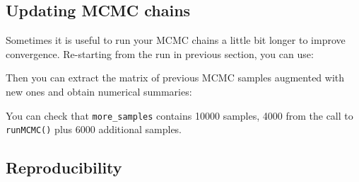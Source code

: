 \documentclass[
  12pt,
]{krantz}
\newenvironment{Shaded}{\begin{snugshade}}{\end{snugshade}}
\newcommand{\AttributeTok}[1]{\textcolor[rgb]{0.13,0.29,0.53}{#1}}
\newcommand{\ConstantTok}[1]{\textcolor[rgb]{0.56,0.35,0.01}{#1}}
\newcommand{\DecValTok}[1]{\textcolor[rgb]{0.00,0.00,0.81}{#1}}
\newcommand{\DocumentationTok}[1]{\textcolor[rgb]{0.56,0.35,0.01}{\textbf{\textit{#1}}}}
\newcommand{\FunctionTok}[1]{\textcolor[rgb]{0.13,0.29,0.53}{\textbf{#1}}}
\newcommand{\NormalTok}[1]{#1}
\newcommand{\OtherTok}[1]{\textcolor[rgb]{0.56,0.35,0.01}{#1}}
\newcommand{\SpecialCharTok}[1]{\textcolor[rgb]{0.81,0.36,0.00}{\textbf{#1}}}
\begin{document}
\hypertarget{updating-mcmc-chains}{%
\subsection{Updating MCMC chains}\label{updating-mcmc-chains}}

Sometimes it is useful to run your MCMC chains a little bit longer to improve convergence. Re-starting from the run in previous section, you can use:

\begin{Shaded}
\end{Shaded}

Then you can extract the matrix of previous MCMC samples augmented with new ones and obtain numerical summaries:

\begin{Shaded}
\end{Shaded}

You can check that \texttt{more\_samples} contains 10000 samples, 4000 from the call to \texttt{runMCMC()} plus 6000 additional samples.

\hypertarget{reproducibility}{%
\subsection{Reproducibility}\label{reproducibility}}
\end{document}

